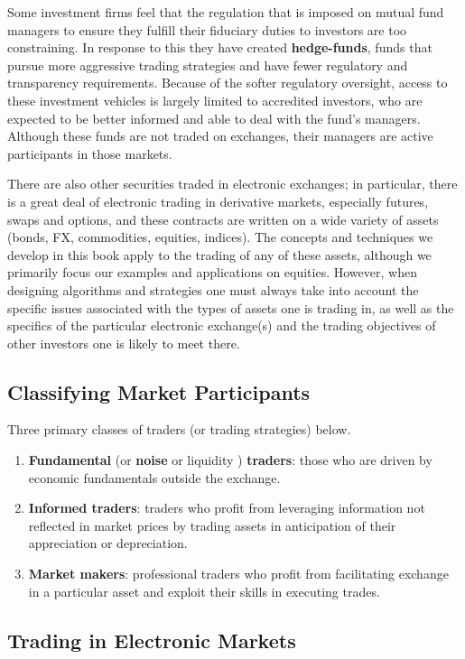 \documentclass[11pt]{article}
\begin{document}
Some investment firms feel that the regulation that is imposed on mutual fund managers to ensure they
fulfill their fiduciary duties to investors are too constraining. In response to this they have
created \textbf{hedge-funds}, funds that pursue more aggressive trading strategies and have fewer regulatory
and transparency requirements. Because of the softer regulatory oversight, access to these investment
vehicles is largely limited to accredited investors, who are expected to be better informed and able
to deal with the fund's managers. Although these funds are not traded on exchanges, their managers are
active participants in those markets.

There are also other securities traded in electronic exchanges; in particular, there is a great deal
of electronic trading in derivative markets, especially futures, swaps and options, and these
contracts are written on a wide variety of assets (bonds, FX, commodities, equities, indices). The
concepts and techniques we develop in this book apply to the trading of any of these assets, although
we primarily focus our examples and applications on equities. However, when designing algorithms and
strategies one must always take into account the specific issues associated with the types of assets
one is trading in, as well as the specifics of the particular electronic exchange(s) and the trading
objectives of other investors one is likely to meet there.
\subsection{Classifying Market Participants}
\label{sec:org05baa38}
Three primary classes of traders (or trading strategies) below.
\begin{enumerate}
\item \textbf{Fundamental} (or \textbf{noise} or liquidity ) \textbf{traders}: those who are driven by economic fundamentals outside the exchange.
\item \textbf{Informed traders}: traders who profit from leveraging information not reflected in market prices by
trading assets in anticipation of their appreciation or depreciation.
\item \textbf{Market makers}: professional traders who profit from facilitating exchange in a particular asset and
exploit their skills in executing trades.
\end{enumerate}
\subsection{Trading in Electronic Markets}
\label{sec:org2ffae7c}
\end{document}
